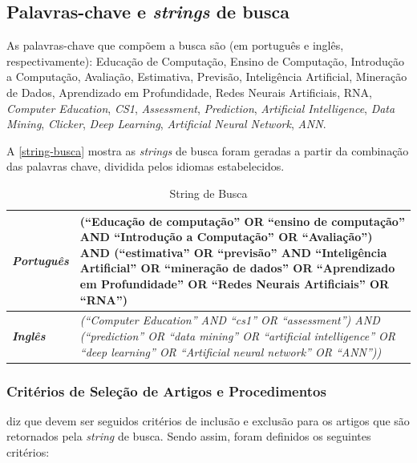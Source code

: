 \documentclass[
	12pt,				%
	openright,			%
	oneside,
	a4paper,			%
	english,			%
	french,				%
	spanish,			%
	brazil,				%
	]{abntex2}
\begin{document}
\subsection{Palavras-chave e \textit{strings} de busca}

As palavras-chave que compõem a busca são (em português e inglês, respectivamente): 
Educação de Computação, Ensino de Computação, Introdução a Computação, Avaliação, Estimativa, Previsão, Inteligência Artificial, Mineração de Dados, Aprendizado em Profundidade, Redes Neurais Artificiais, RNA, \textit{Computer Education}, \textit{CS1}, \textit{Assessment}, \textit{Prediction}, \textit{Artificial Intelligence}, \textit{Data Mining}, \textit{Clicker}, \textit{Deep Learning}, \textit{Artificial Neural Network}, \textit{ANN}.

A \autoref{string-busca} mostra as \textit{strings} de busca foram geradas a partir da combinação das palavras chave, dividida pelos idiomas estabelecidos.

\begin{center}
\begin{longtable}{|| p{3cm} || p{10cm} ||}
\caption{String de Busca}
\label{string-busca}
\hline
\textit{\textbf{Português}} & (``Educação de computação'' OR ``ensino de computação'' AND ``Introdução a Computação'' OR ``Avaliação'') AND (``estimativa'' OR ``previsão'' AND ``Inteligência Artificial'' OR ``mineração de dados'' OR ``Aprendizado em Profundidade'' OR ``Redes Neurais Artificiais'' OR ``RNA'')\\
\hline \hline
\textit{\textbf{Inglês}} & \textit{(``Computer Education'' AND ``cs1'' OR ``assessment'') AND (``prediction'' OR ``data mining'' OR ``artificial intelligence'' OR ``deep learning'' OR ``Artificial neural network'' OR ``ANN''))}\\
 \hline \hline
\end{longtable}
\end{center}

\subsubsection{Critérios de Seleção de Artigos e Procedimentos}
 diz que devem ser seguidos critérios de inclusão e exclusão para os artigos que são retornados pela \textit{string} de busca. Sendo assim, foram definidos os seguintes critérios:
\end{document}
